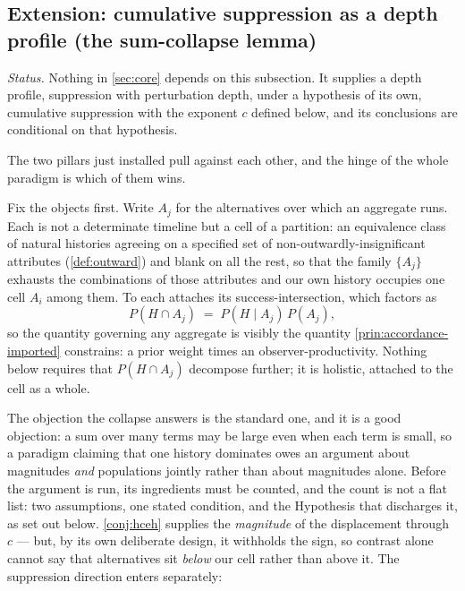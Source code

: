 \documentclass[11pt]{article}
\theoremstyle{definition}
\begin{document}
\subsection{Extension: cumulative suppression as a depth profile (the sum-collapse lemma)}

\noindent\textit{Status.} Nothing in \autoref{sec:core} depends on this subsection. It supplies a depth profile, suppression with perturbation depth, under a hypothesis of its own, cumulative suppression with the exponent $c$ defined below, and its conclusions are conditional on that hypothesis.
\label{sec:landscape-collapse}

The two pillars just installed pull against each other, and the hinge of the whole paradigm is which of them wins.

Fix the objects first. Write $A_j$ for the alternatives over which an aggregate runs. Each is not a determinate timeline but a cell of a partition: an equivalence class of natural histories agreeing on a specified set of non-outwardly-insignificant attributes (\autoref{def:outward}) and blank on all the rest, so that the family $\{A_j\}$ exhausts the combinations of those attributes and our own history occupies one cell $A_i$ among them. To each attaches its success-intersection, which factors as
\begin{equation}
\label{eq:success-factored}
P(H \cap A_j) \;=\; P(H \mid A_j)\, P(A_j),
\end{equation}
so the quantity governing any aggregate is visibly the quantity \autoref{prin:accordance-imported} constrains: a prior weight times an observer-productivity. Nothing below requires that $P(H \cap A_j)$ decompose further; it is holistic, attached to the cell as a whole.

The objection the collapse answers is the standard one, and it is a good objection: a sum over many terms may be large even when each term is small, so a paradigm claiming that one history dominates owes an argument about magnitudes \emph{and} populations jointly rather than about magnitudes alone. Before the argument is run, its ingredients must be counted, and the count is not a flat list: two assumptions, one stated condition, and the Hypothesis that discharges it, as set out below. \autoref{conj:hceh} supplies the \emph{magnitude} of the displacement through $c$ --- but, by its own deliberate design, it withholds the sign, so contrast alone cannot say that alternatives sit \emph{below} our cell rather than above it. The suppression direction enters separately:
\end{document}
